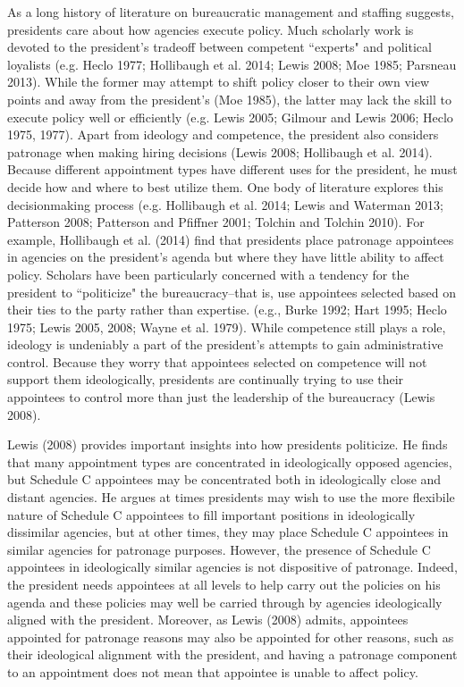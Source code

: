 \documentclass[12pt]{article}
\begin{document}
	As a long history of literature on bureaucratic management and staffing suggests, presidents care about how agencies execute policy. Much scholarly work is devoted to the president's tradeoff between competent ``experts" and political loyalists (e.g. Heclo 1977; Hollibaugh et al. 2014; Lewis 2008; Moe 1985; Parsneau 2013). While the former may attempt to shift policy closer to their own view points and away from the president's (Moe 1985), the latter may lack the skill to execute policy well or efficiently (e.g. Lewis 2005; Gilmour and Lewis 2006; Heclo 1975, 1977). Apart from ideology and competence, the president also considers patronage when making hiring decisions (Lewis 2008; Hollibaugh et al. 2014). Because different appointment types have different uses for the president, he must decide how and where to best utilize them. One body of literature explores this decisionmaking process (e.g. Hollibaugh et al. 2014; Lewis and Waterman 2013; Patterson 2008; Patterson and Pfiffner 2001; Tolchin and Tolchin 2010). For example, Hollibaugh et al. (2014) find that presidents place patronage appointees in agencies on the president's agenda but where they have little ability to affect policy. Scholars have been particularly concerned with a tendency for the president to ``politicize" the bureaucracy--that is, use appointees selected based on their ties to the party rather than expertise. (e.g., Burke 1992; Hart 1995; Heclo 1975; Lewis 2005, 2008; Wayne et al. 1979). While competence still plays a role, ideology is undeniably a part of the president's attempts to gain administrative control. Because they worry that appointees selected on competence will not support them ideologically, presidents are continually trying to use their appointees to control more than just the leadership of the bureaucracy (Lewis 2008).

Lewis (2008) provides important insights into how presidents politicize. He finds that many appointment types are concentrated in ideologically opposed agencies, but Schedule C appointees may be concentrated both in ideologically close and distant agencies. He argues at times presidents may wish to use the more flexibile nature of Schedule C appointees to fill important positions in ideologically dissimilar agencies, but at other times, they may place Schedule C appointees in similar agencies for patronage purposes. However, the presence of Schedule C appointees in ideologically similar agencies is not dispositive of patronage. Indeed, the president needs appointees at all levels to help carry out the policies on his agenda and these policies may well be carried through by agencies ideologically aligned with the president. Moreover, as Lewis (2008) admits, appointees appointed for patronage reasons may also be appointed for other reasons, such as their ideological alignment with the president, and having a patronage component to an appointment does not mean that appointee is unable to affect policy. 
\end{document}
